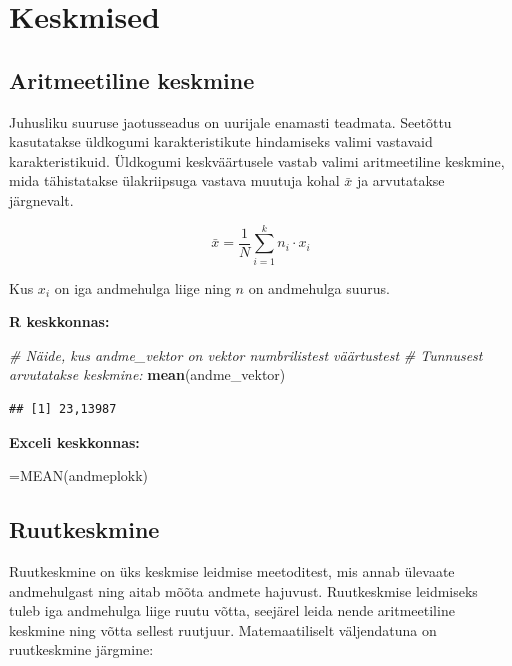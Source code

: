 \documentclass[
]{book}
\newenvironment{Shaded}{\begin{snugshade}}{\end{snugshade}}
\newcommand{\CommentTok}[1]{\textcolor[rgb]{0.56,0.35,0.01}{\textit{#1}}}
\newcommand{\FunctionTok}[1]{\textcolor[rgb]{0.13,0.29,0.53}{\textbf{#1}}}
\newcommand{\NormalTok}[1]{#1}
\renewenvironment{Shaded} {\begin{snugshade}\footnotesize} {\end{snugshade}}
\begin{document}
\section{Keskmised}\label{keskmised}

\subsection{Aritmeetiline keskmine}\label{aritmeetiline-keskmine}

Juhusliku suuruse jaotusseadus on uurijale enamasti teadmata. Seetõttu kasutatakse üldkogumi karakteristikute hindamiseks valimi vastavaid karakteristikuid. Üldkogumi keskväärtusele vastab valimi aritmeetiline keskmine, mida tähistatakse ülakriipsuga vastava muutuja kohal \(\bar x\) ja arvutatakse järgnevalt.

\[ \bar x=\frac{1}{N}\sum_{i=1}^{k}n_i \cdot x_i \]

Kus \(x_{i}\) on iga andmehulga liige ning \(n\) on andmehulga suurus.

\textbf{R keskkonnas:}

\begin{Shaded}
\begin{Highlighting}[]
\CommentTok{\# Näide, kus andme\_vektor on vektor numbrilistest väärtustest}
\CommentTok{\# Tunnusest arvutatakse keskmine:}
\FunctionTok{mean}\NormalTok{(andme\_vektor)}
\end{Highlighting}
\end{Shaded}

\begin{verbatim}
## [1] 23,13987
\end{verbatim}

\textbf{Exceli keskkonnas:}

\begin{Shaded}
\begin{Highlighting}[]
\NormalTok{=MEAN(andmeplokk)}
\end{Highlighting}
\end{Shaded}

\subsection{Ruutkeskmine}\label{ruutkeskmine}

Ruutkeskmine on üks keskmise leidmise meetoditest, mis annab ülevaate andmehulgast ning aitab mõõta andmete hajuvust. Ruutkeskmise leidmiseks tuleb iga andmehulga liige ruutu võtta, seejärel leida nende aritmeetiline keskmine ning võtta sellest ruutjuur. Matemaatiliselt väljendatuna on ruutkeskmine järgmine:
\end{document}
